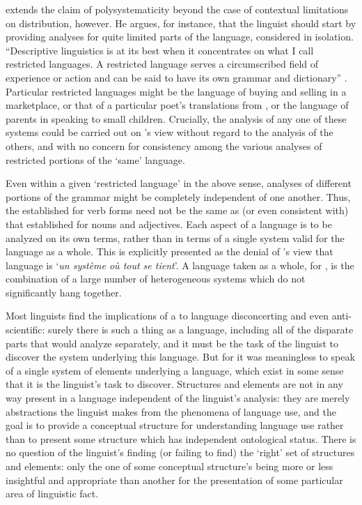 {\Firth} extends the claim of polysystematicity beyond the case of
contextual limitations on distribution, however. He argues, for
instance, that the linguist should start by providing analyses for
quite limited parts of the language, considered in
isolation. ``Descriptive linguistics is at its best when it
concentrates on what I call restricted languages. A restricted
language serves a circumscribed field of experience or action and can
be said to have its own grammar and dictionary''
\citep{firth56:translation}. Particular restricted languages might be
the language of buying and selling in a marketplace, or that of a
particular poet's translations from , or the language of
parents in speaking to small children. Crucially, the analysis of any
one of these systems could be carried out on {\Firth}'s view without
regard to the analysis of the others, and with no concern for
consistency among the various analyses of restricted portions of the
`same' language.

Even within a given `restricted language' in the above sense, analyses
of different portions of the grammar might be completely independent
of one another. Thus, the  established for verb
forms need not be the same as (or even consistent with) that
established for nouns and adjectives. Each aspect of a language is to
be analyzed on its own terms, rather than in terms of a single system
valid for the language as a whole. This  is
explicitly presented as the denial of {\Meillet}'s view that language is
`\emph{un système où tout se tient}'. A language taken as a whole, for
{\Firth}, is the combination of a large number of heterogeneous systems
which do not significantly hang together.

Most linguists find the implications of a  to
language disconcerting and even anti-scientific: surely there is such a
thing as a language, including all of the disparate parts that {\Firth}
would analyze separately, and it must be the task of the linguist to
discover the system underlying this language. But for {\Firth} it was
meaningless to speak of a single system of elements underlying a
language, which exist in some sense that it is the linguist's task to
discover. Structures and elements are not in any way present in a
language independent of the linguist's analysis: they are merely
abstractions the linguist makes from the phenomena of language use,
and the goal is to provide a conceptual structure for understanding
language use rather than to present some structure which has
independent ontological status. There is no question of the linguist's
finding (or failing to find) the `right' set of structures and
elements: only the one of some conceptual structure's being more or
less insightful and appropriate than another for the presentation of
some particular area of linguistic fact.

